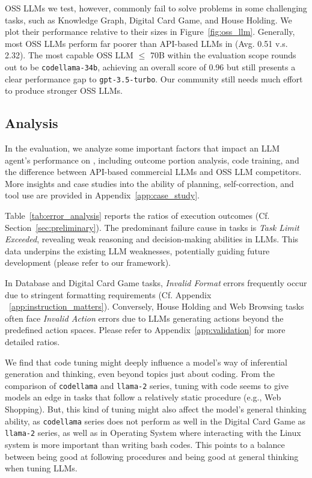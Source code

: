 OSS LLMs we test, however, commonly fail to solve problems in some challenging tasks, such as Knowledge Graph, Digital Card Game, and House Holding.
We plot their performance relative to their sizes in Figure~\ref{fig:oss_llm}.
Generally, most OSS LLMs perform far poorer than API-based LLMs in \model (Avg. 0.51 v.s. 2.32).
The most capable OSS LLM $\leq$ 70B within the evaluation scope rounds out to be \texttt{codellama-34b}, achieving an overall score of 0.96 but still presents a clear performance gap to \texttt{gpt-3.5-turbo}.
Our community still needs much effort to produce stronger OSS LLMs.



\subsection{Analysis}

\label{sec:analysis}

In the evaluation, we analyze some important factors that impact an LLM agent's performance on \model, including outcome portion analysis, code training, and the difference between API-based commercial LLMs and OSS LLM competitors.
More insights and case studies into the ability of planning, self-correction, and tool use are provided in Appendix~\ref{app:case_study}.

Table~\ref{tab:error_analysis} reports the ratios of execution outcomes (Cf. Section~\ref{sec:preliminary}). The predominant failure cause in \model tasks is \textit{Task Limit Exceeded}, revealing weak reasoning and decision-making abilities in LLMs. This data underpins the existing LLM weaknesses, potentially guiding future development (please refer to our framework).

In Database and Digital Card Game tasks, \textit{Invalid Format} errors frequently occur due to stringent formatting requirements (Cf. Appendix ~\ref{app:instruction_matters}). Conversely, House Holding and Web Browsing tasks often face \textit{Invalid Action} errors due to LLMs generating actions beyond the predefined action spaces. Please refer to Appendix~\ref{app:validation} for more detailed ratios.

We find that code tuning might deeply influence a model's way of inferential generation and thinking, even beyond topics just about coding. 
From the comparison of \texttt{codellama} and \texttt{llama-2} series, tuning with code seems to give models an edge in tasks that follow a relatively static procedure (e.g., Web Shopping). 
But, this kind of tuning might also affect the model's general thinking ability, as  \texttt{codellama} series does not perform as well in the Digital Card Game as \texttt{llama-2} series, as well as in Operating System where interacting with the Linux system is more important than writing bash codes. 
This points to a balance between being good at following procedures and being good at general thinking when tuning LLMs.

